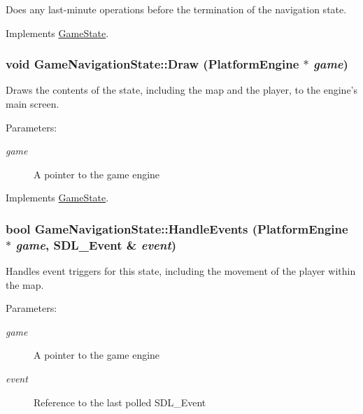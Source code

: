 Does any last-minute operations before the termination of the navigation state. 

Implements \hyperlink{class_game_state_041e7a5430d71da84745af11abdacd93}{GameState}.\hypertarget{class_game_navigation_state_a37dce070a906454c512192c067fda09}{
\subsubsection[{Draw}]{\setlength{\rightskip}{0pt plus 5cm}void GameNavigationState::Draw ({\bf PlatformEngine} $\ast$ {\em game})}}
\label{class_game_navigation_state_a37dce070a906454c512192c067fda09}


Draws the contents of the state, including the map and the player, to the engine's main screen.

\begin{Desc}
\item[Parameters:]
\begin{description}
\item[{\em game}]A pointer to the game engine \end{description}
\end{Desc}


Implements \hyperlink{class_game_state_7333dda0f49b3fa1c01cd3295f853024}{GameState}.\hypertarget{class_game_navigation_state_6e7c13d35a33478673c62ae55394cfdc}{
\subsubsection[{HandleEvents}]{\setlength{\rightskip}{0pt plus 5cm}bool GameNavigationState::HandleEvents ({\bf PlatformEngine} $\ast$ {\em game}, \/  SDL\_\-Event \& {\em event})}}
\label{class_game_navigation_state_6e7c13d35a33478673c62ae55394cfdc}


Handles event triggers for this state, including the movement of the player within the map.

\begin{Desc}
\item[Parameters:]
\begin{description}
\item[{\em game}]A pointer to the game engine \item[{\em event}]Reference to the last polled SDL\_\-Event \end{description}
\end{Desc}


